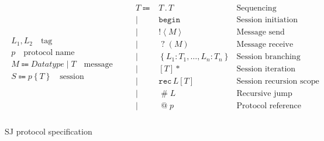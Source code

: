 \documentclass{llncs}
\begin{document}
\begin{figure}
\begin{gather*}
\begin{array}{c}
L_1, L_2\quad\mbox{tag}
\\[10pt]
p\quad\mbox{protocol name}
\\[10pt]
M \Coloneqq \textit{Datatype} \mid T \quad\mbox{message}
\\[10pt]
S \Coloneqq  p\left\{ T \right\} \quad \mbox{session}
\end{array}
\qquad
\begin{array}{rlr}
T \Coloneqq & T\mathbin{.}T & \mbox{Sequencing} \\ 
       \mid & \texttt{begin} & \mbox{Session initiation} \\
       \mid & \mathopen{!}\left<M\right> & \mbox{Message send} \\ 
       \mid & \mathopen{?}\left(M\right) & \mbox{Message receive} \\
       \mid & \left\{L_1 \colon T_1,\dots, L_n \colon T_n \right\} & \mbox{Session branching} \\ %
       \mid & \left[T\right]* & \mbox{Session iteration} \\ 
       \mid & \texttt{rec}\,L\left[T\right] & \mbox{Session recursion scope} \\ 
       \mid & \mathopen{\#}L & \mbox{Recursive jump} \\ 
       \mid & \mathopen{@}p & \mbox{Protocol reference} \\
\end{array}
\end{gather*}
\caption{SJ protocol specification}\label{tab:prot-spec} 
\end{figure}

\end{document}
